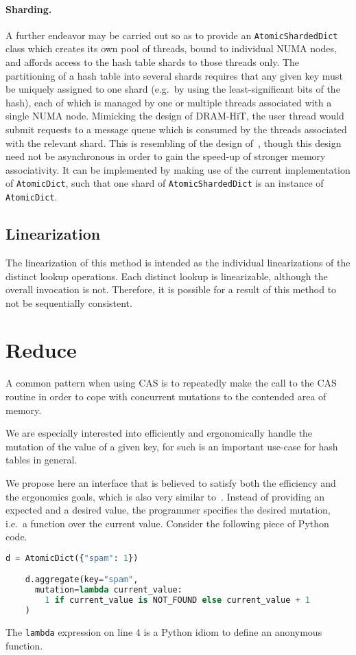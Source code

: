 \paragraph{Sharding.}
A further endeavor may be carried out so as to provide an \texttt{Atomic\-ShardedDict} class which creates its own pool of threads, bound to individual NUMA nodes, and affords access to the hash table shards to those threads only.
The partitioning of a hash table into several shards requires that any given key must be uniquely assigned to one shard (e.g.\ by using the least-significant bits of the hash), each of which is managed by one or multiple threads associated with a single NUMA node.
Mimicking the design of DRAM-HiT, the user thread would submit requests to a message queue which is consumed by the threads associated with the relevant shard.
This is resembling of the design of~\cite{dramhit}, though this design need not be asynchronous in order to gain the speed-up of stronger memory associativity.
It can be implemented by making use of the current implementation of \texttt{AtomicDict}, such that one shard of \texttt{AtomicShardedDict} is an instance of \texttt{AtomicDict}.

\subsection{Linearization}\label{subsec:batch-lookup-linearization}

The linearization of this method is intended as the individual linearizations of the distinct lookup operations.
Each distinct lookup is linearizable, although the overall invocation is not.
Therefore, it is possible for a result of this method to not be sequentially consistent.


\section{Reduce}\label{sec:reduce}

A common pattern when using CAS is to repeatedly make the call to the CAS routine in order to cope with concurrent mutations to the contended area of memory.

We are especially interested into efficiently and ergonomically handle the mutation of the value of a given key, for such is an important use-case for hash tables in general.

We propose here an interface that is believed to satisfy both the efficiency and the ergonomics goals, which is also very similar to~\cite[Algorithm~1]{maier}.
Instead of providing an expected and a desired value, the programmer specifies the desired mutation, i.e.\ a function over the current value.
Consider the following piece of Python code.
\begin{lstlisting}[label={lst:aggregate-usage}, language=Python]
	d = AtomicDict({"spam": 1})

	d.aggregate(key="spam",
	  mutation=lambda current_value:
	    1 if current_value is NOT_FOUND else current_value + 1
	)
\end{lstlisting}
The \texttt{lambda} expression on line 4 is a Python idiom to define an anonymous function.

